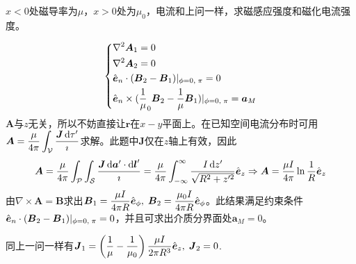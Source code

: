 \documentclass{mynote}
\begin{document}
\begin{exercise}{3.4}
    $x<0$处磁导率为$\mu$，$x>0$处为$\mu_0$，电流和上问一样，求磁感应强度和磁化电流强度。
\end{exercise}
\begin{solution}
\[
    \left\{
        \begin{aligned}
            & \nabla^2 \boldsymbol{A}_1 = 0\\
            & \nabla^2 \boldsymbol{A}_2 = 0 \\
            & \hat{\boldsymbol{e}}_n \cdot (\boldsymbol{B}_2 - \boldsymbol{B}_1) |_{\phi = 0,\; \pi}= 0 \\
            & \hat{\boldsymbol{e}}_n \times (\dfrac{1}{\mu}_0 \boldsymbol{B}_2 - \dfrac{1}{\mu} \boldsymbol{B}_1) |_{\phi = 0,\; \pi}=\boldsymbol{a}_M
        \end{aligned} 
    \right.    
 \]
 $\bm{A}$与$z$无关，所以不妨直接让$\bm{r}$在$x-y$平面上。在已知空间电流分布时可用$\boldsymbol{A}  = \dfrac{\mu}{4 \pi} \displaystyle\int_{\mathcal{V}} \dfrac{\boldsymbol{J} \mathop{}\!\mathrm{d} \tau '}{\imath}$求解。此题中$\bm{J}$仅在$z$轴上有效，因此
 \[
 \boldsymbol{A} = \frac{\mu}{4\pi} \int_{\mathcal{P}} \int_{\mathcal{S}} \dfrac{\boldsymbol{J} \mathop{}\!\mathrm{d} \boldsymbol{a}' \cdot \mathop{}\!\mathrm{d} \boldsymbol{l}'}{\imath} = \frac{\mu}{4\pi} \int_{-\infty}^{\infty} \frac{I \mathop{}\!\mathrm{d} z'}{\sqrt{R^2 + z'^2}} \hat{\boldsymbol{e}}_z \Rightarrow \boldsymbol{A} = \frac{\mu I}{4 \pi} \ln \frac{1}{R} \hat{\boldsymbol{e}}_z
 \]
 由$\nabla \times \bm{A} = \bm{B}$求出$\boldsymbol{B}_1 = \dfrac{\mu I}{4 \pi R} \hat{\boldsymbol{e}}_{\phi},\; \boldsymbol{B}_2 = \dfrac{\mu_0 I}{4 \pi R} \hat{\boldsymbol{e}}_{\phi}$。此结果满足约束条件$\hat{\boldsymbol{e}}_n \cdot (\boldsymbol{B}_2 - \boldsymbol{B}_1) |_{\phi = 0,\; \pi}= 0$，并且可求出介质分界面处$\bm{a}_M = 0$。

同上一问一样有$\boldsymbol{J}_1 =  \left( \dfrac{1}{\mu} - \dfrac{1}{\mu_0} \right)\dfrac{\mu I}{2\pi R^3} \hat{\boldsymbol{e}}_z ,\; \boldsymbol{J}_2 = 0$.

\end{solution}
\end{document}

